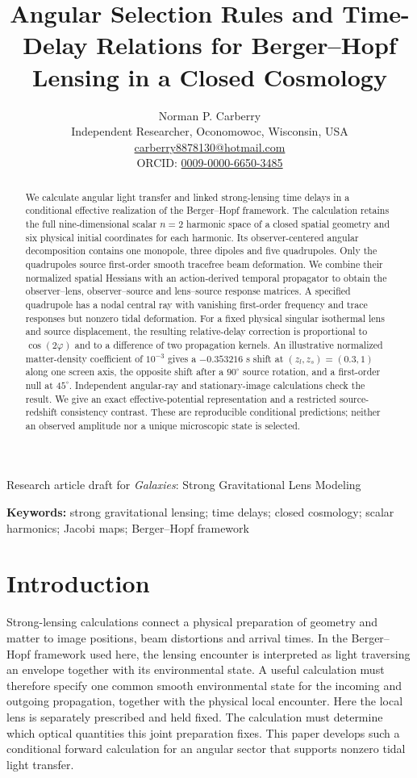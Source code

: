 \documentclass[11pt,a4paper]{article}
\title{\textbf{Angular Selection Rules and Time-Delay Relations for
Berger--Hopf Lensing in a Closed Cosmology}}
\author{Norman P. Carberry\\[3pt]
\small Independent Researcher, Oconomowoc, Wisconsin, USA\\
\small \href{mailto:carberry8878130@hotmail.com}{carberry8878130@hotmail.com}\\
\small ORCID: \href{https://orcid.org/0009-0000-6650-3485}{0009-0000-6650-3485}}
\date{}
\begin{document}
\maketitle
\begin{center}
\small Research article draft for \emph{Galaxies}: Strong Gravitational Lens Modeling
\end{center}
\begin{abstract}
We calculate angular light transfer and linked strong-lensing time delays
in a conditional effective realization of the Berger--Hopf framework.
The calculation retains the full nine-dimensional scalar $n=2$ harmonic
space of a closed spatial geometry and six physical initial coordinates
for each harmonic. Its observer-centered angular decomposition contains
one monopole, three dipoles and five quadrupoles. Only the quadrupoles
source first-order smooth tracefree beam deformation. We combine their
normalized spatial Hessians with an action-derived temporal propagator
to obtain the observer--lens, observer--source and lens--source response
matrices. A specified quadrupole has a nodal central ray with vanishing
first-order frequency and trace responses but nonzero tidal deformation.
For a fixed physical singular isothermal lens and source displacement,
the resulting relative-delay correction is proportional to
$\cos(2\varphi)$ and to a difference of two propagation kernels.
An illustrative normalized matter-density coefficient of $10^{-3}$ gives
a $-0.353216$ s shift at $(z_l,z_s)=(0.3,1)$ along one screen axis,
the opposite shift after a $90^\circ$ source rotation, and a first-order
null at $45^\circ$. Independent angular-ray and stationary-image
calculations check the result. We give an exact effective-potential
representation and a restricted source-redshift consistency contrast.
These are reproducible conditional predictions; neither an observed
amplitude nor a unique microscopic state is selected.
\end{abstract}
\noindent\textbf{Keywords:} strong gravitational lensing; time delays;
closed cosmology; scalar harmonics; Jacobi maps; Berger--Hopf framework

\section{Introduction}

Strong-lensing calculations connect a physical preparation of geometry and
matter to image positions, beam distortions and arrival times. In the
Berger--Hopf framework used here, the lensing encounter is interpreted as
light traversing an envelope together with its environmental state. A
useful calculation must therefore specify one common smooth environmental
state for the incoming and outgoing propagation, together with the physical
local encounter. Here the local lens is separately prescribed and held
fixed. The calculation must determine which optical quantities this joint
preparation fixes.
This paper develops such a conditional forward calculation for an angular
sector that supports nonzero tidal light transfer.
\end{document}
